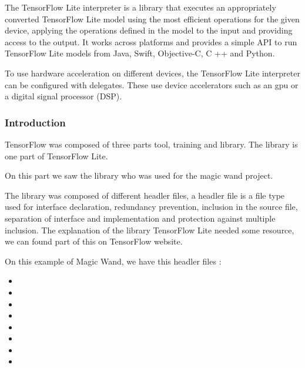 The TensorFlow Lite interpreter is a library that executes an appropriately converted TensorFlow Lite model using the most efficient operations for the given device, applying the operations defined in the model to the input and providing access to the output. It works across platforms and provides a simple API to run TensorFlow Lite models from Java, Swift, Objective-C, C ++ and Python.\cite{Google.09.10.2020,Warden:2020}

To use hardware acceleration on different devices, the TensorFlow Lite interpreter can be configured with \glqq delegates\grqq. These use device accelerators such as an \ac{gpu} or a digital signal processor (DSP). \cite{Google.09.10.2020}

\subsubsection{Introduction}

TensorFlow was composed of three parts tool, training and library. The library is one part of TensorFlow Lite. 

On this part we saw the library who was used for the magic wand project.

The library was composed of different headler files, a headler file is a file type used for interface declaration, redundancy prevention, inclusion in the source file, separation of interface and implementation and protection against multiple inclusion. 
The explanation of the library TensorFlow Lite needed some resource, we can found part of this on TensorFlow website. \cite{GoogleTensorFlowAPI:2023}

\bigskip

On this example of Magic Wand, we have this headler files : 

\begin{itemize}
    \item {}
    \item {}
    \item {}
    \item {}
    \item {}
    \item {}
    \item {}
    \item {}
\end{itemize}

